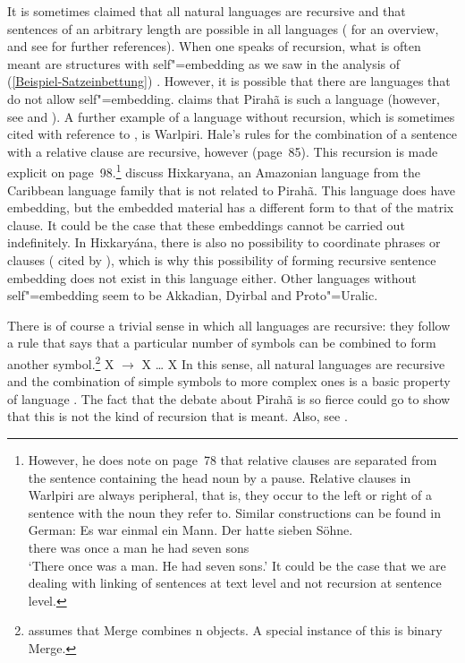 It is sometimes claimed that all natural languages are recursive and that sentences of an arbitrary
length are possible in all languages (\citealp*[]{HNG2005a} for an overview, and see  for further references). When one speaks of recursion,
what is often meant are structures with self"=embedding as we saw in the analysis of (\ref{Beispiel-Satzeinbettung}) \citep{Fitch2010a}. 
However, it is possible that there are languages that do not allow self"=embedding. \citet{Everett2005a-u} claims that
Pirah{\~a} is such a language (however, see  and
). 
A further example of a language without recursion, which is sometimes cited with reference to , is Warlpiri.
Hale's rules for the combination of a sentence with a relative clause are recursive, however (page~85). This recursion is made
explicit on page~98.\footnote{%
	However, he does note on page~78 that relative clauses are separated from the sentence
        containing the head noun by a pause. Relative clauses in Warlpiri are always peripheral, that is, they occur to the left or right of a sentence with the noun they refer to. Similar
	constructions can be found in German:
\ea
\gll Es war einmal ein Mann. Der hatte sieben Söhne.\\
	 there was once a man he had seven sons\\
\glt `There once was a man. He had seven sons.'
\z
It could be the case that we are dealing with linking of sentences at text level and not recursion at sentence level.
} \citet[]{PS2010a} discuss Hixkaryana, an Amazonian language from the Caribbean language
family that is not related to Pirah{\~a}. This language does have embedding, but the embedded
material has a different form to that of the matrix clause. It could be the case that these embeddings cannot be carried out indefinitely. In Hixkary{\'a}na,
there is also no possibility to coordinate phrases or clauses ( cited by ), which is why this possibility of forming recursive sentence embedding does not
exist in this language either. Other languages without self"=embedding seem to be Akkadian, Dyirbal and Proto"=Uralic.
	
There is of course a trivial sense in which all languages are recursive: they follow a rule that says that a particular number of symbols can be combined
to form another symbol.\footnote{
  \citet[]{Chomsky2005a} assumes that Merge combines n objects. A special instance of this is binary Merge.
}
\ea
X $\to$ X \ldots{} X
\z
In this sense, all natural languages are recursive and the combination of simple symbols to more complex ones is a basic property of language \citep[]{Hockett60a}. The fact that the debate about Pirah{\~a} is so fierce could go to show that this is not the kind of recursion that is meant.
Also, see \citet{Fitch2010a}.

